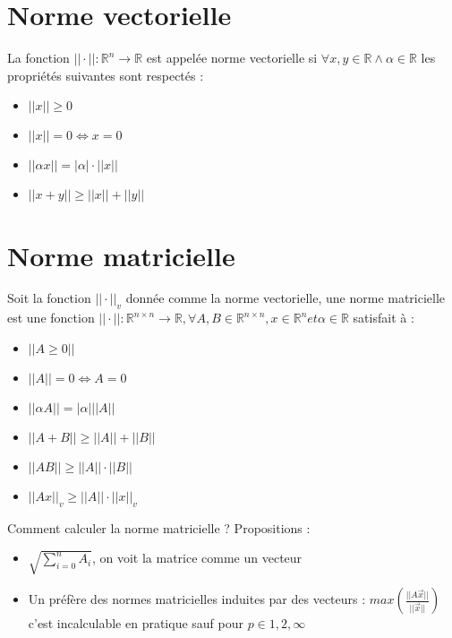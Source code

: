 \documentclass[a4paper,9pt]{extarticle}
\newcommand{\vecnorm}[1]{||#1||}
\begin{document}
\section{Norme vectorielle}

La fonction $||\cdot|| : \mathbb{R}^n \rightarrow \mathbb{R}$ est appelée norme vectorielle si $\forall x,y \in \mathbb{R} \wedge \alpha \in \mathbb{R}$ les propriétés suivantes sont respectés :
\begin{itemize}
    \item $\vecnorm{x} \geq 0$
    \item $\vecnorm{x} = 0 \Longleftrightarrow x = 0$
    \item $\vecnorm{\alpha x} = |\alpha|\cdot\vecnorm{x}$
    \item $\vecnorm{x+y} \geq \vecnorm{x} + \vecnorm{y}$
\end{itemize}

\section{Norme matricielle}

Soit la fonction $\vecnorm{\cdot}_v$ donnée comme la norme vectorielle, une norme matricielle est une fonction $\vecnorm{\cdot} : \mathbb{R}^{n \times n} \rightarrow \mathbb{R}, \forall A,B \in \mathbb{R}^{n \times n}, x \in \mathbb{R}^n et \alpha \in \mathbb{R}$ satisfait à :
\begin{itemize}
    \item $\vecnorm{A \geq 0}$
    \item $\vecnorm{A} = 0 \Longleftrightarrow A = 0$
    \item $\vecnorm{\alpha A} = |\alpha| \vecnorm{A}$
    \item $\vecnorm{A+B} \geq \vecnorm{A} + \vecnorm{B}$
    \item $\vecnorm{AB}  \geq \vecnorm{A} \cdot \vecnorm{B}$
    \item $\vecnorm{Ax}_v \geq \vecnorm{A} \cdot \vecnorm{x}_v$
\end{itemize}

Comment calculer la norme matricielle ? Propositions :
\begin{itemize}
    \item $\sqrt{\sum^n_{i=0} A_i}$, on voit la matrice comme un vecteur
    \item Un préfère des normes matricielles induites par des vecteurs : $max(\frac{\vecnorm{A\overrightarrow{x}}}{\vecnorm{\overrightarrow{x}}})$ c'est incalculable en pratique sauf pour $p \in {1,2,\infty}$
    \end{itemize}
\end{document}

